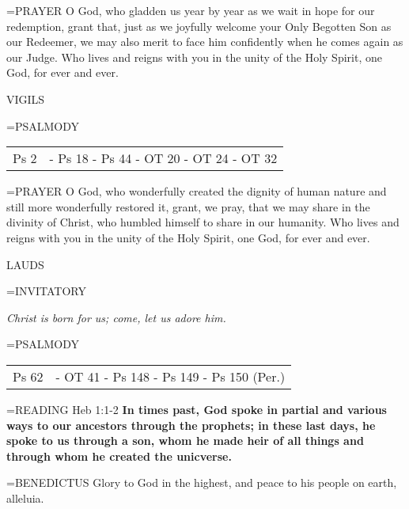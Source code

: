 \hangindent=\parindent \small{PRAYER 	O God, who gladden us year by year as we wait in hope for our redemption, grant that, just as we joyfully welcome your Only Begotten Son as our Redeemer, we may also merit to face him confidently when he comes again as our Judge. Who lives and reigns with you in the unity of the Holy Spirit, one God, for ever and ever.}

\begin{flushleft}\normalsize VIGILS\\\end{flushleft}
\hangindent=\parindent \small{PSALMODY}
\begin{center}
\begin{tabular}{ l l }
Ps 2 &  - Ps 18 - Ps 44 - OT 20 - OT 24 - OT 32\\
\end{tabular}
\end{center}		

\hangindent=\parindent \small{PRAYER 	O God, who wonderfully created the dignity of human nature and still more wonderfully restored it, grant, we pray, that we may share in the divinity of Christ, who humbled himself to share in our humanity. Who lives and reigns with you in the unity of the Holy Spirit, one God, for ever and ever.}

\begin{flushleft}\normalsize LAUDS\\\end{flushleft}
\hangindent=\parindent \small{INVITATORY}
\begin{center}
\textit{Christ is born for us; come, let us adore him.\\}
\end{center}

\hangindent=\parindent \small{PSALMODY}
\begin{center}
\begin{tabular}{ l l }
Ps 62 &  - OT 41 - Ps 148 - Ps 149 - Ps 150 (Per.)\\
\end{tabular}
\end{center}		

\hangindent=\parindent \small{READING}    Heb 1:1-2 \textbf{   In times past, God spoke in partial and various ways to our ancestors through the prophets; in these last days, he spoke to us through a son, whom he made heir of all things and through whom he created the unicverse.\\}

\hangindent=\parindent \small{BENEDICTUS 	Glory to God in the highest, and peace to his people on earth, alleluia.\\}

